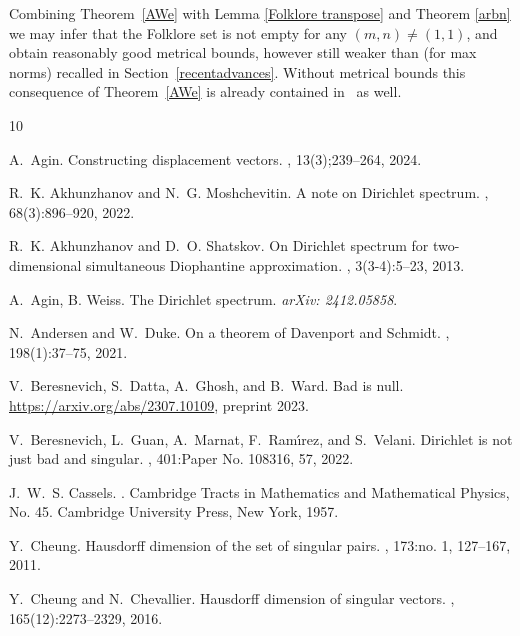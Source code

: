 \documentclass[10pt]{amsart}
\theoremstyle{definition}
\begin{document}
 Combining Theorem~\ref{AWe} with Lemma \ref{Folklore transpose} and Theorem \ref{arbn} we may infer that the Folklore set is not empty for
 any $(m,n)\ne (1,1)$, and obtain reasonably good metrical bounds, however
 still weaker than \cite[Theorem~3.15]{Dasetal} (for max norms) recalled in Section~\ref{recentadvances}. Without metrical bounds this consequence of Theorem~\ref{AWe} is already contained in~\cite{AginWeiss2024} as well.
 


%
%

\begin{thebibliography}{10}

A.~Agin.
\newblock Constructing displacement vectors.
, 13(3);239--264, 2024.

R.~K. Akhunzhanov and N.~G. Moshchevitin.
\newblock A note on {D}irichlet spectrum.
, 68(3):896--920, 2022.

R.~K. Akhunzhanov and D.~O. Shatskov.
\newblock On {D}irichlet spectrum for two-dimensional simultaneous
  {D}iophantine approximation.
, 3(3-4):5--23, 2013.

 A.~Agin, B. Weiss. The Dirichlet spectrum. {\em arXiv: 2412.05858}.

N.~Andersen and W.~Duke.
\newblock On a theorem of {D}avenport and {S}chmidt.
, 198(1):37--75, 2021.

V.~Beresnevich, S.~Datta, A.~Ghosh, and B.~Ward.
\newblock Bad is null.
\newblock \url{https://arxiv.org/abs/2307.10109}, preprint 2023.

V.~Beresnevich, L.~Guan, A.~Marnat, F.~Ram\'{\i}rez, and S.~Velani.
\newblock Dirichlet is not just bad and singular.
, 401:Paper No. 108316, 57, 2022.

J.~W.~S. Cassels.
.
\newblock Cambridge Tracts in Mathematics and Mathematical Physics, No. 45.
  Cambridge University Press, New York, 1957.

Y.~Cheung.
\newblock Hausdorff dimension of the set of singular pairs.
, 173:no. 1, 127--167, 2011.

Y.~Cheung and N.~Chevallier.
\newblock Hausdorff dimension of singular vectors.
, 165(12):2273--2329, 2016.


\end{thebibliography}
\end{document}
